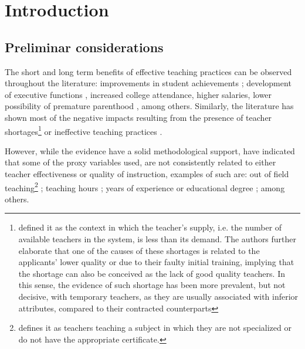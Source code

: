 \chapter{Introduction}

\section{Preliminar considerations}

The short and long term benefits of effective teaching practices can be observed throughout the literature: improvements in student achievements \citep{Rockoff_2004, Rivkin_et_al_2005, Duflo_et_al_2009, Hanushek_et_al_2012, Muralidharan_et_al_2013, Chetty_et_al_2014a, Araujo_et_al_2016}; development of executive functions \citep{Araujo_et_al_2016}, increased college attendance, higher salaries, lower possibility of premature parenthood \citep{Chetty_et_al_2014b}, among others. Similarly, the literature has shown most of the negative impacts resulting from the presence of teacher shortages\footnote{\citet{Bertoni_et_al_2020a} defined it as the context in which the teacher's supply, i.e. the number of available teachers in the system, is less than its demand. The authors further elaborate that one of the causes of these shortages is related to the applicants' lower quality or due to their faulty initial training, implying that the shortage can also be conceived as the lack of good quality teachers. In this sense, the evidence of such shortage has been more prevalent, but not decisive, with temporary teachers, as they are usually associated with inferior attributes, compared to their contracted counterparts} \citep{Duflo_et_al_2009, Muralidharan_et_al_2013, Duflo_et_al_2015, Ayala_2017, Marotta_2019} or ineffective teaching practices \citep{Hanushek_et_al_2012}.

However, while the evidence have a solid methodological support, \citet{Hanushek_et_al_2006} have indicated that some of the proxy variables used, are not consistently related to either teacher effectiveness or quality of instruction, examples of such are: out of field teaching\footnote{\citet{Medeiros_et_al_2018} defines it as teachers teaching a subject in which they are not specialized or do not have the appropriate certificate.} \citep{Ingersoll_1998, Dee_et_al_2008, Bertoni_et_al_2020a}; teaching hours \citep{Bruns_et_al_2015}; years of experience or educational degree \citep{Rockoff_2004, Rivkin_et_al_2005, Clotfelter_et_al_2006, Clotfelter_et_al_2007, Hanushek_et_al_2012}; among others.

